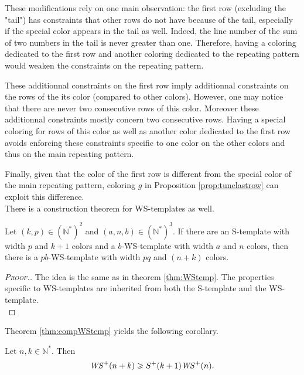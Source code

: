 \par
These modifications rely on one main observation: the first row (excluding the "tail") has constraints that other rows do not 
have because of the tail, especially if the special color appears in the tail as well. Indeed, the line number of the
sum of two numbers in the tail is never greater than one. Therefore, having a coloring dedicated to 
the first row and another coloring dedicated to the repeating pattern would weaken the constraints on the repeating pattern. 

\par
These additionnal constraints on the first row imply additionnal constraints on the rows of the its color (compared to other 
colors). However, one may notice that there are never two consecutive rows of this color. Moreover these additionnal constraints 
mostly concern two consecutive rows. Having a special coloring for rows of this color as well as another color dedicated to the 
first row avoids enforcing these constraints specific to one color on the other colors and thus on the main repeating pattern.

\par
Finally, given that the color of the first row is different from the special color of the main repeating pattern, coloring \(g\) in
Proposition \ref{prop:tunelastrow} can exploit this difference. \\

There is a construction theorem for WS-templates as well.

\begin{theorem}
\label{thm:compWStemp}
Let \((k,p) \in (\mathbb{N}^*)^2\) and \((a, n, b) \in (\mathbb{N}^*)^3\). If there are an S-template with width
\(p\) and \(k+1\) colors and a \(b\)-WS-template with width \(a\) and \(n\) colors, then there is a \(pb\)-WS-template
with width \(pq\) and \((n+k)\) colors.
\end{theorem}

\begin{proof}[\textsc{Proof.}]
The idea is the same as in theorem \ref{thm:WStemp}. The properties specific to WS-templates are inherited 
from both the S-template and the WS-template. \\
\end{proof}

Theorem \ref{thm:compWStemp} yields the following corollary.

\begin{corollary}
Let \(n, k \in \mathbb{N}^*\). Then
\[
\mathit{WS}^+(n+k) \geqslant S^+(k+1) \mathit{WS}^+(n).
\]
\end{corollary}


